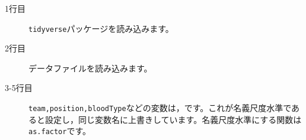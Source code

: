 \begin{description}
	\item[1行目] \texttt{tidyverse}パッケージを読み込みます。
	\item[2行目] データファイルを読み込みます。
	\item[3-5行目] \texttt{team,position,bloodType}などの変数は，です。これが名義尺度水準であると設定し，同じ変数名に上書きしています。名義尺度水準にする関数は\texttt{as.factor}です。
\end{description}
